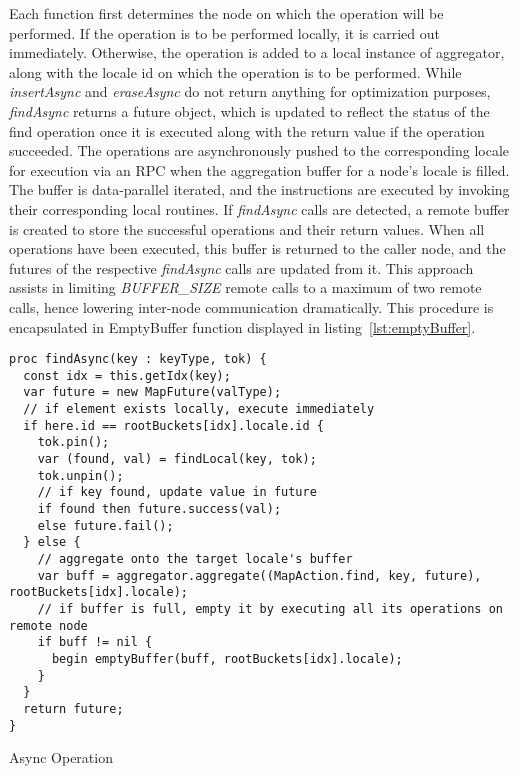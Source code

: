 \documentclass[letterpaper, 10 pt, conference]{ieeeconf}  %
\begin{document}
Each function first determines the node on which the operation will be performed. If the operation is to be performed locally, it is carried out immediately. Otherwise, the operation is added to a local instance of aggregator, along with the locale id on which the operation is to be performed. While \textit{insertAsync} and \textit{eraseAsync} do not return anything for optimization purposes, \textit{findAsync} returns a future object, which is updated to reflect the status of the find operation once it is executed along with the return value if the operation succeeded. The operations are asynchronously pushed to the corresponding locale for execution via an RPC when the aggregation buffer for a node's locale is filled. The buffer is data-parallel iterated, and the instructions are executed by invoking their corresponding local routines. If \textit{findAsync} calls are detected, a remote buffer is created to store the successful operations and their return values. When all operations have been executed, this buffer is returned to the caller node, and the futures of the respective \textit{findAsync} calls are updated from it. This approach assists in limiting \textit{BUFFER\_SIZE} remote calls to a maximum of two remote calls, hence lowering inter-node communication dramatically. This procedure is encapsulated in EmptyBuffer function displayed in listing~\ref{lst:emptyBuffer}.

\begin{listing}
 \begin{verbatim}
proc findAsync(key : keyType, tok) {
  const idx = this.getIdx(key);
  var future = new MapFuture(valType);
  // if element exists locally, execute immediately
  if here.id == rootBuckets[idx].locale.id {
    tok.pin();
    var (found, val) = findLocal(key, tok);
    tok.unpin();
    // if key found, update value in future
    if found then future.success(val);
    else future.fail();
  } else {
    // aggregate onto the target locale's buffer
    var buff = aggregator.aggregate((MapAction.find, key, future), rootBuckets[idx].locale);
    // if buffer is full, empty it by executing all its operations on remote node
    if buff != nil {
      begin emptyBuffer(buff, rootBuckets[idx].locale);
    }
  }
  return future;
}
\end{verbatim}
\caption{Async Operation}
\label{lst:asyncOp}
\end{listing}
\end{document}

